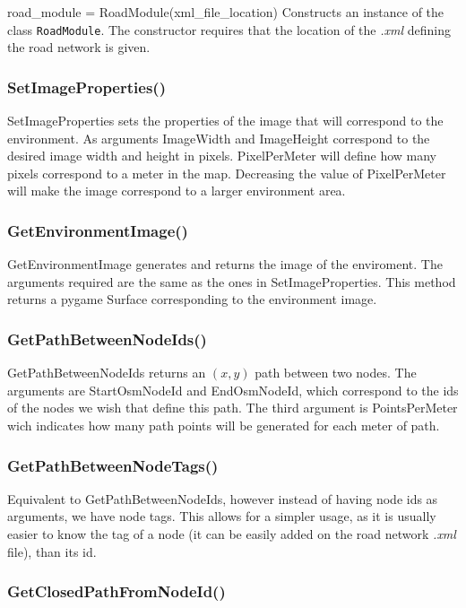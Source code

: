 road\_module = RoadModule(xml\_file\_location) Constructs an instance of the class \texttt{RoadModule}. The constructor requires that the location of the \textit{.xml} defining the road network is given.

\subsubsection{SetImageProperties()}

SetImageProperties sets the properties of the image that will correspond to the environment. As arguments ImageWidth and ImageHeight correspond to the desired image width and height in pixels. PixelPerMeter will define how many pixels correspond to a meter in the map. Decreasing the value of PixelPerMeter will make the image correspond to a larger environment area.

\subsubsection{GetEnvironmentImage()}

GetEnvironmentImage generates and returns the image of the enviroment. The arguments required are the same as the ones in SetImageProperties. This method returns a pygame Surface corresponding to the environment image.

\subsubsection{GetPathBetweenNodeIds()}

GetPathBetweenNodeIds returns an $(x,y)$ path between two nodes. The arguments are StartOsmNodeId and EndOsmNodeId, which correspond to the ids of the nodes we wish that define this path. The third argument is PointsPerMeter wich indicates how many path points will be generated for each meter of path.

\subsubsection{GetPathBetweenNodeTags()}

Equivalent to GetPathBetweenNodeIds, however instead of having node ids as arguments, we have node tags. This allows for a simpler usage, as it is usually easier to know the tag of a node (it can be easily added on the road network \textit{.xml} file), than its id.

\subsubsection{GetClosedPathFromNodeId()}

